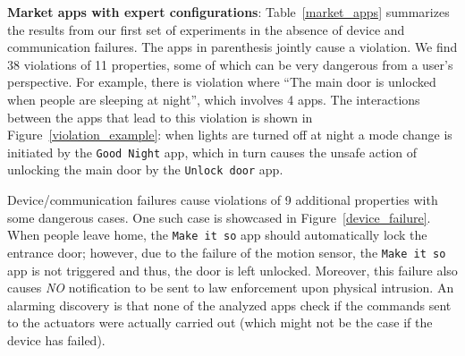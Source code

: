 \textbf{Market apps with expert configurations}:
Table~\ref{market_apps} summarizes the results from our first set of experiments in the absence of device and communication failures.
The apps in parenthesis {\color{black} jointly cause} a violation. We find 38 violations of 11 properties,
some of which can be very dangerous from a user's perspective.
For example, there is violation where ``The main door is unlocked when people are sleeping at night'', which involves 4 apps.
The interactions between the apps that lead to this violation is shown in Figure~\ref{violation_example}:
when lights are turned off at night a mode change is initiated by the \texttt{Good Night} app,
which in turn causes the unsafe action of unlocking the main door by the \texttt{Unlock door} app.

Device/communication failures cause violations of 9 additional properties with some dangerous cases.
One such case is showcased in Figure~\ref{device_failure}.
{\color{black}When people leave home, the \texttt{Make it so} app should automatically lock the entrance door;
however, due to the failure of the motion sensor, the \texttt{Make it so} app is not triggered and thus, the door is left unlocked.
Moreover, this failure also causes {\em NO} notification to be sent to law enforcement upon physical intrusion.}
An alarming discovery is that none of the analyzed apps check if the commands sent to the actuators
were actually carried out (which might not be the case if the device has failed).


